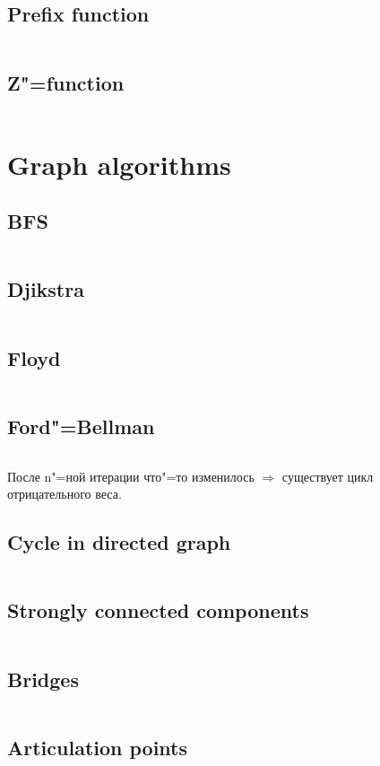 ﻿\documentclass[10pt,twocolumn,oneside]{article}
\begin{document}
\subsection{Prefix function}
\inputminted[breaklines]{python}{String algorithms/prefix-function.py}
\subsection{Z"=function}
\inputminted[breaklines]{python}{String algorithms/z-function.py}

\section{Graph algorithms}
\subsection{BFS}
\inputminted[breaklines]{cpp}{Graph algorithms/bfs.cpp}
\subsection{Djikstra}
\inputminted[breaklines]{cpp}{Graph algorithms/djikstra.cpp}
\subsection{Floyd}
\inputminted[breaklines]{cpp}{Graph algorithms/floyd.cpp}
\subsection{Ford"=Bellman}
\inputminted[breaklines]{python}{Graph algorithms/ford-bellman.py}
После n"=ной итерации что"=то изменилось $\Rightarrow$ существует цикл отрицательного веса.
\subsection{Cycle in directed graph}
\inputminted[breaklines]{cpp}{Graph algorithms/cycle in directed graph.cpp}
\subsection{Strongly connected components}
\inputminted[breaklines]{cpp}{Graph algorithms/strongly connected components.cpp}
\subsection{Bridges}
\inputminted[breaklines]{cpp}{Graph algorithms/bridges.cpp}
\subsection{Articulation points}
\inputminted[breaklines]{cpp}{Graph algorithms/articulation points.cpp}
\end{document}
